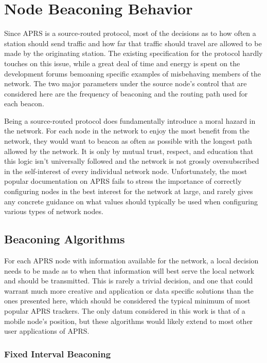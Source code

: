 \chapter{Node Beaconing Behavior}

Since APRS is a source-routed protocol, most of the decisions as
to how often a station should send traffic and how far that traffic should
travel are allowed to be made by the originating station. 
The existing specification for the protocol hardly touches on this issue, 
while a great deal of time and energy is spent on the development forums 
bemoaning specific examples of misbehaving members of the network.
The two major parameters under the source node's control that are considered
here are the frequency of beaconing and the routing path used for each beacon.

Being a source-routed protocol does fundamentally introduce a
moral hazard in the network. For each node in the network to enjoy the
most benefit from the network, they would want to beacon as often as possible 
with the longest path allowed by the network.
It is only by mutual trust, respect, and education that this 
logic isn't universally followed and the network is not grossly oversubscribed
in the self-interest of every individual network node. 
Unfortunately, the most popular documentation on APRS fails to stress the 
importance of correctly configuring nodes in the best interest for the network
at large, and rarely gives any concrete guidance on what values should typically
be used when configuring various types of network nodes.


\section{Beaconing Algorithms}

For each APRS node with information available for the network,
a local decision needs to be made as to when that information will best 
serve the local network and should be transmitted. This is rarely a trivial 
decision, and one that could warrant much more creative and application or data
specific solutions than the ones presented here, which should be considered 
the typical minimum of most popular APRS trackers. The only datum considered 
in this work is that of a mobile node's position, but these algorithms would
likely extend to most other user applications of APRS.

\subsection{Fixed Interval Beaconing}

